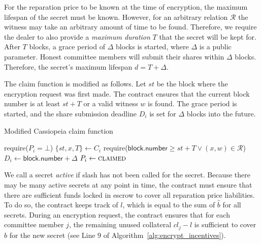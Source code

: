 For the reparation price to be known at the time of encryption, the maximum lifespan of the secret must be known.
However, for an arbitrary relation $\mathcal{R}$ the witness may take an arbitrary amount of time to be found.
Therefore, we require the dealer to also provide a \emph{maximum duration} $T$ that the secret will be kept for.
After $T$ blocks, a grace period of $\Delta$ blocks is started, where $\Delta$ is a public parameter.
Honest committee members will submit their shares within $\Delta$ blocks.
Therefore, the secret's maximum lifespan $d = T + \Delta$.

The \textsf{claim} function is modified as follows.
Let $st$ be the block where the encryption request was first made.
The contract ensures that the current block number is at least $st + T$ or a valid witness $w$ is found.
The grace period is started, and the share submission deadline $D_i$ is set for $\Delta$ blocks into the future.

\begin{algorithm}[H]
\caption{Modified Cassiopeia \textsf{claim} function}
    \begin{algorithmic}[1]
                \State require($P_i = \bot$)
                \State $\{st, x, T\} \gets C_i$
                \State require($\textsf{block.number} \geq st + T \lor (x, w) \in \mathcal{R}$)
                \State $D_i \gets \textsf{block.number} + \Delta$
                \State $P_i \gets \textsc{claimed}$
            \EndFunction
    \end{algorithmic}
\end{algorithm}

We call a secret \emph{active} if \textsf{slash} has not been called for the secret.
Because there may be many active secrets at any point in time, the contract must ensure that there are sufficient funds locked in escrow to cover all reparation price liabilities.
To do so, the contract keeps track of $l$, which is equal to the sum of $\hat{b}$ for all secrets.
During an encryption request, the contract ensures that for each committee member $j$, the remaining unused collateral $cl_j - l$ is sufficient to cover $\hat{b}$ for the new secret (see Line 9 of Algorithm~\ref{alg:encrypt_incentives}).

